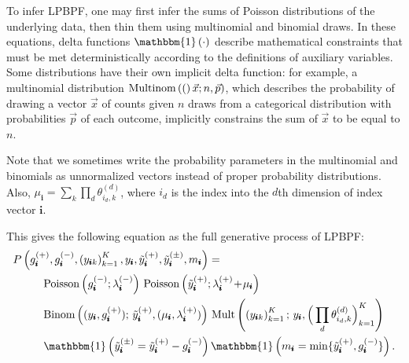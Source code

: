\documentclass{article}
\newcommand{\subs}{\pmb{i}}
\newcommand{\wsup}[2]{#1_{\subs}^{(#2)}}
\newcommand{\ytP}{\wsup{\tilde{y}}{+}}
\newcommand{\ytPM}{\wsup{\tilde{y}}{\pm}}
\newcommand{\ysk}{y_{\subs k}}
\newcommand{\ys}{y_{\subs}}
\newcommand{\lamP}{\wsup{\lambda}{+}}
\newcommand{\lamM}{\wsup{\lambda}{-}}
\newcommand{\gP}{\wsup{g}{+}}
\newcommand{\gM}{\wsup{g}{-}}
\newcommand{\ms}{m_{\subs}}
\newcommand{\Multi}[1]{\textup{Multinom}\left( #1 \right)}
\newcommand{\Pois}[1]{\textup{Poisson}\left( #1 \right)}
\newcommand{\tp}{\!+\!}
\begin{document}
To infer LPBPF, one may first infer the sums of Poisson distributions of the
underlying data, then thin them using multinomial and binomial draws. In these
equations, delta functions $\mathbbm{1}\left( \cdot \right)$ describe
mathematical constraints that must be met deterministically according to the
definitions of auxiliary variables. Some distributions have their own implicit
delta function: for example, a multinomial distribution $\Multi(\vec{x}; n,
\vec{p})$, which describes the probability of drawing a vector $\vec{x}$ of
counts given $n$ draws from a categorical distribution with probabilities
$\vec{p}$ of each outcome, implicitly constrains the sum of $\vec{x}$ to be
equal to $n$.

Note that we sometimes write the probability parameters in the multinomial and
binomials as unnormalized vectors instead of proper probability distributions.
Also, $\mu_{\subs} = \sum_k \prod_d
\theta_{i_d,k}^{(d)}$, where $i_d$ is the index into the $d$th dimension of
index vector $\subs$.

This gives the following equation as the full generative process of LPBPF:
\begin{align} 
  P &\left(\gP, \gM, \left(\ysk\right)_{k=1}^K, \ys,
    \ytP, \ytPM, \ms\right) = \notag \\
  &\quad\quad \Pois{\gM; \lamM} \,
    \Pois { \ytP; \lamP \tp \mu_{\subs} }
    \notag \\
  &\quad\quad \text{Binom}\left((\ys, \gP);\, \ytP,(\mu_{\subs}, \lamP)\right) \, \text{Mult}\left(\left(\ysk\right)_{k=1}^K;\, \ys, \Big( \prod_d \theta_{i_d,k}^{(d)} \Big)_{k=1}^K\right) \notag \\
  &\quad\quad \mathbbm{1}\left(\ytPM =
    \ytP - \gM\right) \mathbbm{1} \left( \ms =
    \min\{\ytP, \gM\} \right) .
\label{eq:lpbpfpois}
\end{align}
\end{document}
